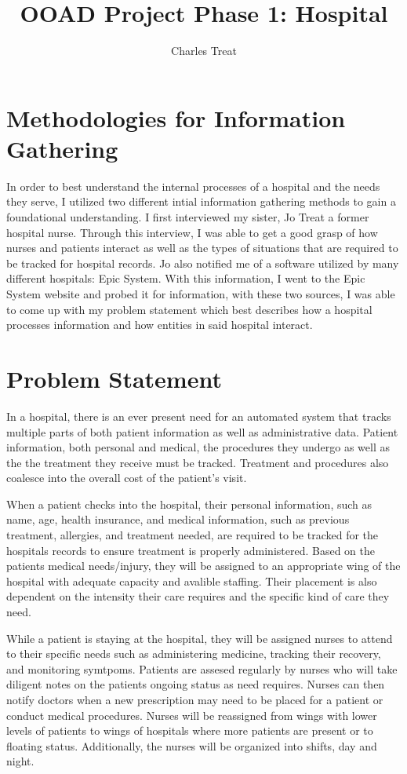 \documentclass{article}
\title{OOAD Project Phase 1: Hospital}
\author{Charles Treat}
\begin{document}
\maketitle

\section{Methodologies for Information Gathering}
In order to best understand the internal processes of a hospital and the needs they serve, I utilized two different intial
information gathering methods to gain a foundational understanding. I first interviewed my sister, Jo Treat a former hospital nurse. Through
this interview, I was able to get a good grasp of how nurses and patients interact as well as the types of situations that are required to be tracked
for hospital records. Jo also notified me of a software utilized by many different hospitals: Epic System. With this information, I went to the Epic System
website and probed it for information, with these two sources, I was able to come up with my problem statement which best describes how a hospital processes 
information and how entities in said hospital interact.

\section{Problem Statement}

\noindent In a hospital, there is an ever present need for an automated system that tracks multiple parts of both patient 
information as well as administrative data. Patient information, both personal and medical, the procedures they undergo as well as the the treatment
they receive must be tracked. Treatment and procedures also coalesce into the overall cost of the patient's visit. 
\break

\noindent When a patient checks into the hospital, their personal information, such as name, age, health insurance, and medical information, such as previous treatment, allergies, and treatment needed, are required to be 
tracked for the hospitals records to ensure treatment is properly administered. Based on the patients medical needs/injury, they will be assigned to an appropriate wing of the hospital with adequate capacity and avalible staffing.
Their placement is also dependent on the intensity their care requires and the specific kind of care they need. 
\break

\noindent While a patient is staying at the hospital, they will be assigned nurses to attend to their specific needs such as administering medicine, tracking their recovery, and monitoring symtpoms. Patients are assesed regularly by nurses
who will take diligent notes on the patients ongoing status as need requires. Nurses can then notify doctors when a new prescription may need to be placed for a patient or conduct medical procedures. 
Nurses will be reassigned from wings with lower levels of patients to wings of hospitals where more patients are present or to floating status. Additionally, the nurses will be organized into shifts, day and night.\hfill \break
\end{document}
